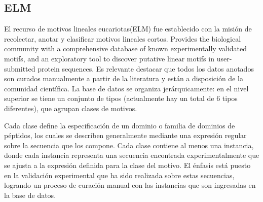 


\subsection{ELM}\label{elm}

El recurso de motivos lineales eucariotas(ELM) \cite{puntervoll2003elm,dinkel2013eukaryotic} fue establecido con la misión de recolectar, anotar y clasificar motivos lineales cortos. 
Provides the biological community with a comprehensive database of known experimentally validated motifs, and an exploratory tool to discover putative linear motifs in user-submitted protein sequences.
Es relevante destacar que todos los datos anotados son curados manualmente a partir de la literatura y están a disposición de la comunidad científica.
La base de datos se organiza jerárquicamente: en el nivel superior se tiene un conjunto de tipos (actualmente hay un total de 6 tipos diferentes), que agrupan clases de motivos. 

Cada clase define la especificación de un dominio o familia de dominios de péptidos, los cuales se describen generalmente mediante una expresión regular sobre la secuencia que los compone.
Cada clase contiene al menos una instancia, donde cada instancia representa una secuencia encontrada experimentalmente que se ajusta a la expresión definida para la clase del motivo.
El énfasis está puesto en la validación experimental que ha sido realizada sobre estas secuencias, logrando un proceso de curación manual con las instancias que son ingresadas en la base de datos. 


